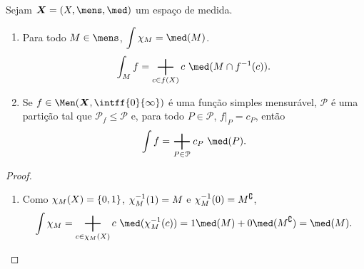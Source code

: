 \begin{prop}
Sejam $\bm X = (X,\mens,\med)$ um espaço de medida.
	\begin{enumerate}
	\item Para todo $M \in \mens$, $\displaystyle\int \idc_M = \med(M)$.
		\begin{equation*}
		\int_M f = \sum_{c \in f(X)} c \ \med(M \cap f\inv(c)).
		\end{equation*}
	
	\item Se $f \in \Men(\bm X,\intff{0}{\infty})$ é uma função simples mensurável, $\mathcal P$ é uma partição tal que $\mathcal P_f \leq \mathcal P$ e, para todo $P \in \mathcal P$, $f|_{P} = c_P$, então
		\begin{equation*}
		\int f = \sum_{P \in \mathcal P} c_P \ \med(P).
		\end{equation*}
	\end{enumerate}
\end{prop}
\begin{proof}
	\begin{enumerate}
	\item Como $\chi_M(X) = \{0,1\}$, $\chi_M^{-1}(1) = M$ e $\chi_M^{-1}(0) = M^\complement$,
		\begin{equation*}
		\int \idc_M = \sum_{c \in \idc_M(X)} c \ \med(\idc_M\inv(c)) = 1 \med(M)+0\med(M^\complement) = \med(M).
		\end{equation*}
	\end{enumerate}
\end{proof}

